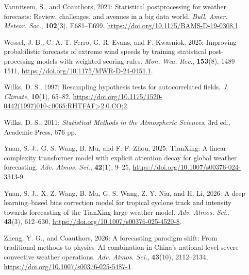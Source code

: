 \documentclass[12pt]{article}
\begin{document}
\begin{Exercises}
\item\hspace*{-6mm}
Vannitsem, S., and Coauthors, 2021: Statistical postprocessing for weather forecasts: Review, challenges, and avenues in a big data world. \textit{Bull. Amer. Meteor. Soc.}, \textbf{102}(3), E681--E699, \url{https://doi.org/10.1175/BAMS-D-19-0308.1}.

\item\hspace*{-6mm}
Wessel, J. B., C. A. T. Ferro, G. R. Evans, and F. Kwasniok, 2025: Improving probabilistic forecasts of extreme wind speeds by training statistical post-processing models with weighted scoring rules. \textit{Mon. Wea. Rev.}, \textbf{153}(8), 1489--1511, \url{https://doi.org/10.1175/MWR-D-24-0151.1}.

\item\hspace*{-6mm}
Wilks, D. S., 1997: Resampling hypothesis tests for autocorrelated fields. \textit{J. Climate}, \textbf{10}(1), 65--82, \url{https://doi.org/10.1175/1520-0442(1997)010<0065:RHTFAF>2.0.CO;2}.

\item\hspace*{-6mm}
Wilks, D. S., 2011: \textit{Statistical Methods in the Atmospheric Sciences}. 3rd ed., Academic Press, 676 pp.

\item\hspace*{-6mm}
Yuan, S. J., G. S. Wang, B. Mu, and F. F. Zhou, 2025: TianXing: A linear complexity transformer model with explicit attention decay for global weather forecasting. \textit{Adv. Atmos. Sci.}, \textbf{42}(1), 9--25, \url{https://doi.org/10.1007/s00376-024-3313-9}.

\item\hspace*{-6mm}
Yuan, S. J., X. Z. Wang, B. Mu, G. S. Wang, Z. Y. Niu, and H. Li, 2026: A deep learning--based bias correction model for tropical cyclone track and intensity towards forecasting of the TianXing large weather model. \textit{Adv. Atmos. Sci.}, \textbf{43}(3), 612--630, \url{https://doi.org/10.1007/s00376-025-4520-8}.

\item\hspace*{-6mm}
Zheng, Y. G., and Coauthors, 2026: A forecasting paradigm shift: From traditional methods to physics--AI combination in China's national-level severe convective weather operations. \textit{Adv. Atmos. Sci.}, \textbf{43}(10), 2112--2134, \url{https://doi.org/10.1007/s00376-025-5487-1}.

\end{Exercises}
\end{document}
